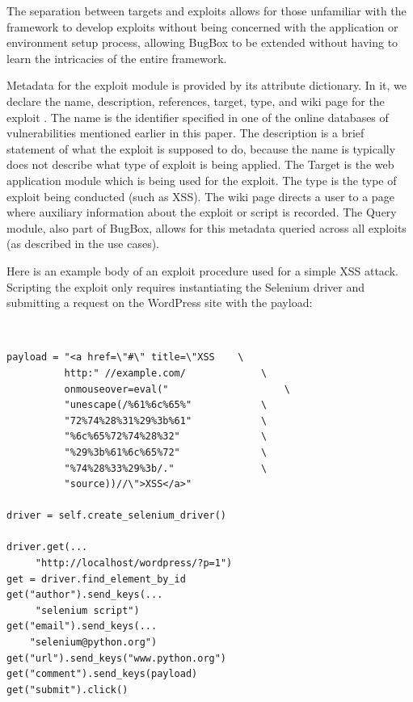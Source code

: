 \documentclass[letterpaper,twocolumn,10pt]{article}
\begin{document}
The separation between targets and exploits allows for those unfamiliar with the framework to develop exploits without being concerned with the application or environment setup process, allowing BugBox to be extended without having to learn the intricacies of the entire framework.\par
 
Metadata for the exploit module is provided by its attribute dictionary. In it, we declare the name, description, references, target, type, and wiki page for the exploit .  The name is the identifier specified in one of the online databases of vulnerabilities mentioned earlier in this paper.  The description is a brief statement of what the exploit is supposed to do, because the name is typically does not describe what type of exploit is being applied.  The Target is the web application module which is being used for the exploit. The type is the type of exploit being conducted (such as XSS). The wiki page directs a user to a page where auxiliary information about the exploit or script is recorded. The Query module, also part of BugBox, allows for this metadata queried across all exploits (as described in the use cases).

Here is an example body of an exploit procedure used for a simple XSS attack. Scripting the exploit only requires instantiating the Selenium driver and submitting a request on the WordPress site with the payload: 

\begin{minipage}{\textwidth}
{\tt \footnotesize
\begin{lstlisting}
payload = "<a href=\"#\" title=\"XSS	\
          http:" //example.com/				\
          onmouseover=eval(" 					\
          "unescape(/%61%6c%65%"			\
          "72%74%28%31%29%3b%61"			\
          "%6c%65%72%74%28%32"				\
          "%29%3b%61%6c%65%72"				\
          "%74%28%33%29%3b/." 				\
          "source))//\">XSS</a>"

driver = self.create_selenium_driver()

driver.get(...
     "http://localhost/wordpress/?p=1")
get = driver.find_element_by_id
get("author").send_keys(...
     "selenium script")
get("email").send_keys(...
    "selenium@python.org")
get("url").send_keys("www.python.org")
get("comment").send_keys(payload)
get("submit").click()
\end{lstlisting}
}
\end{minipage}
\end{document}
